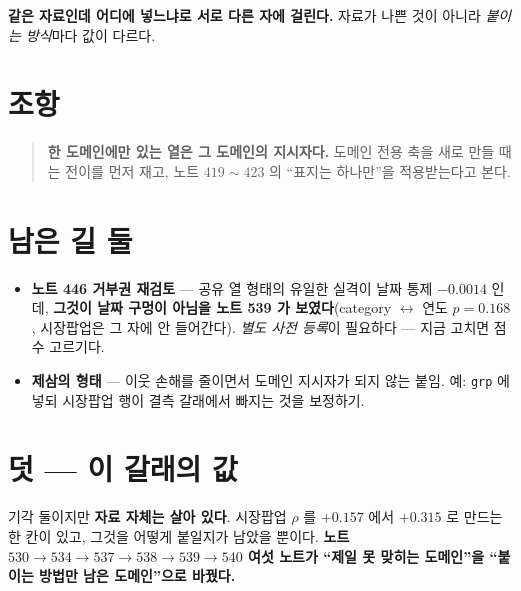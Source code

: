 \documentclass[11pt]{article}
\begin{document}
\textbf{같은 자료인데 어디에 넣느냐로 서로 다른 자에 걸린다.} 자료가 나쁜
것이 아니라 \emph{붙이는 방식}마다 값이 다르다.

\section*{조항}

\begin{quote}
\textbf{한 도메인에만 있는 열은 그 도메인의 지시자다.} 도메인 전용 축을 새로
만들 때는 전이를 먼저 재고, 노트 $419\!\sim\!423$ 의 ``표지는 하나만''을
적용받는다고 본다.
\end{quote}

\section*{남은 길 둘}

\begin{itemize}
\item \textbf{노트 446 거부권 재검토} --- 공유 열 형태의 유일한 실격이
날짜 통제 $-0.0014$ 인데, \textbf{그것이 날짜 구멍이 아님을 노트 539 가
보였다}(category $\leftrightarrow$ 연도 $p = 0.168$, 시장팝업은 그 자에
안 들어간다). \emph{별도 사전 등록}이 필요하다 --- 지금 고치면 점수 고르기다.
\item \textbf{제삼의 형태} --- 이웃 손해를 줄이면서 도메인 지시자가 되지 않는
붙임. 예: \texttt{grp} 에 넣되 시장팝업 행이 결측 갈래에서 빠지는 것을
보정하기.
\end{itemize}

\section*{덧 --- 이 갈래의 값}

기각 둘이지만 \textbf{자료 자체는 살아 있다}. 시장팝업 $\rho$ 를 $+0.157$ 에서
$+0.315$ 로 만드는 한 칸이 있고, 그것을 어떻게 붙일지가 남았을 뿐이다.
\textbf{노트 $530 \to 534 \to 537 \to 538 \to 539 \to 540$ 여섯 노트가
``제일 못 맞히는 도메인''을 ``붙이는 방법만 남은 도메인''으로 바꿨다.}
\end{document}
